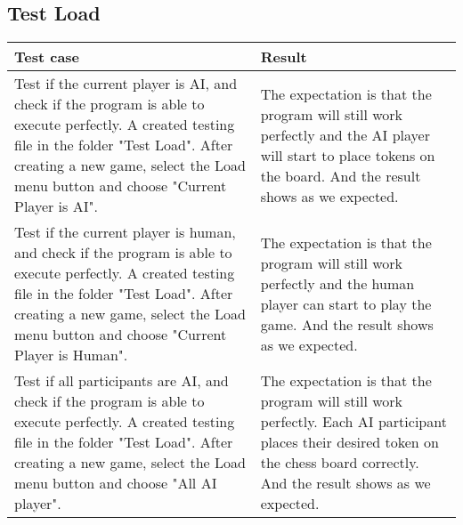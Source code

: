 \subsection{Test Load}

\begin{table}[h]
	\centering
	\begin{tabular}{p{7cm}@{\hskip 5mm}  p{7cm}} 
		\toprule
		Test case   & Result   \\ 
		\midrule
		\midrule
	    Test if the current player is AI, and check if the program is able to execute perfectly. A created testing file in the folder "Test Load". After creating a new game, select the Load menu button and choose "Current Player is AI".  & The expectation is that the program will still work perfectly and the AI player will start to place tokens on the board. And the result shows as we expected.  \\ 
	    \midrule
	    Test if the current player is human, and check if the program is able to execute perfectly. A created testing file in the folder "Test Load". After creating a new game, select the Load menu button and choose "Current Player is Human".  & The expectation is that the program will still work perfectly and the human player can start to play the game. And the result shows as we expected.  \\ 
	    \midrule
	    Test if all participants are AI, and check if the program is able to execute perfectly. A created testing file in the folder "Test Load". After creating a new game, select the Load menu button and choose "All AI player".  & The expectation is that the program will still work perfectly. Each AI participant places their desired token on the chess board correctly. And the result shows as we expected.  \\ 
	    
		\bottomrule
	\end{tabular}
\end{table}